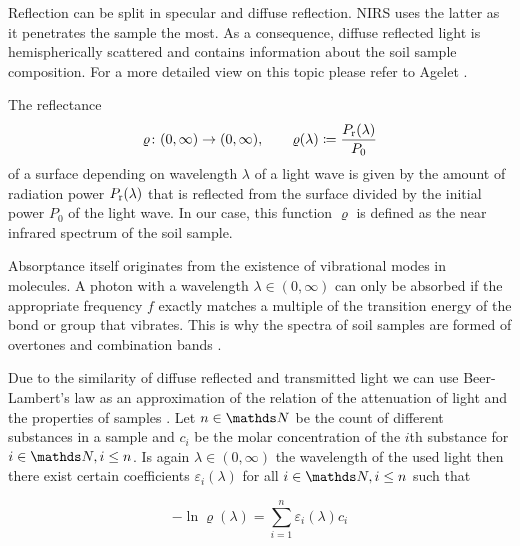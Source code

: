 		Reflection can be split in specular and diffuse reflection.
		NIRS uses the latter as it penetrates the sample the most.
		As a consequence, diffuse reflected light is hemispherically scattered and contains information about the soil sample composition.
		For a more detailed view on this topic please refer to Agelet \citeyear[248-251]{agelet:10a}.

		The reflectance 
		\[
			\varrho\colon(0,\infty)\to(0,\infty),\qquad \varrho(\lambda) \coloneqq \frac{P_{\mathrm{r}}(\lambda)}{P_0}
		\]
		of a surface depending on wavelength $\lambda$ of a light wave is given by the amount of radiation power $P_{\mathrm{r}}(\lambda)$ that is reflected from the surface divided by the initial power $P_0$ of the light wave.	
		In our case, this function $\varrho$ is defined as the near infrared spectrum of the soil sample.

		Absorptance itself originates from the existence of vibrational modes in molecules.
		A photon with a wavelength $\lambda \in (0,\infty)$ can only be absorbed if the appropriate frequency $f$ exactly matches a multiple of the transition energy of the bond or group that vibrates.
		This is why the spectra of soil samples are formed of overtones and combination bands \cite[247]{agelet:10a}.

		Due to the similarity of diffuse reflected and transmitted light we can use Beer-Lambert's law as an approximation of the relation of the attenuation of light and the properties of samples \cite[247-8]{agelet:10a}.
		Let $n\in\SN$ be the count of different substances in a sample and $c_i$ be the molar concentration of the $i$th substance for $i\in\SN,i\leq n$.
		Is again $\lambda \in (0,\infty)$ the wavelength of the used light then there exist certain coefficients $\varepsilon_i(\lambda)$ for all $i\in\SN,i\leq n$ such that

		\[
			-\ln \varrho(\lambda) = \sum_{i=1}^{n} \varepsilon_i(\lambda) c_i
		\]


